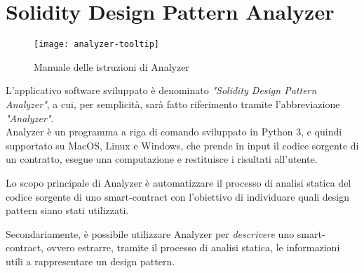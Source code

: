 \chapter{Solidity Design Pattern Analyzer}
\begin{figure}[H]
	\centering
	\texttt{[image: analyzer-tooltip]}
	\caption{Manuale delle istruzioni di Analyzer}
	\label{analyzer-help-tip}
\end{figure}
L'applicativo software sviluppato è denominato \textit{"Solidity Design Pattern Analyzer"}, a cui, per semplicità, sarà fatto riferimento tramite l'abbreviazione \textit{"Analyzer"}.\\
\newline
Analyzer è un programma a riga di comando sviluppato in Python 3, e quindi supportato su MacOS, Linux e Windows, che prende in input il codice sorgente di un contratto, esegue una computazione e restituisce i risultati all'utente.\par
Lo scopo principale di Analyzer è automatizzare il processo di analisi statica del codice sorgente di uno smart-contract con l'obiettivo di individuare quali design pattern siano stati utilizzati.\par
Secondariamente, è possibile utilizzare Analyzer per \textit{descrivere} uno smart-contract, ovvero estrarre, tramite il processo di analisi statica, le informazioni utili a rappresentare un design pattern.

